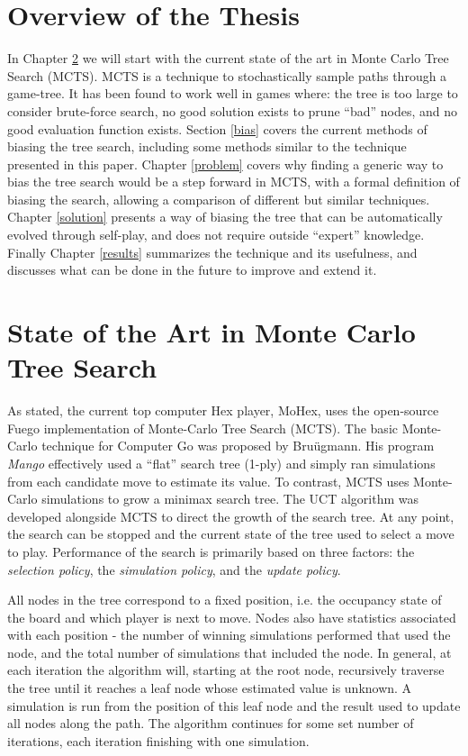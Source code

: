 \documentclass[11pt]{report}
\begin{document}
\section{Overview of the Thesis}\label{overview}
In Chapter \ref{mcts} we will start with the current state of the art in Monte Carlo Tree Search (MCTS). MCTS is a technique to stochastically sample paths through a game-tree. It has been found to work well in games where: the tree is too large to consider brute-force search, no good solution exists to prune ``bad'' nodes, and no good evaluation function exists. Section \ref{bias} covers the current methods of biasing the tree search, including some methods similar to the technique presented in this paper. Chapter \ref{problem} covers why finding a generic way to bias the tree search would be a step forward in MCTS, with a formal definition of biasing the search, allowing a comparison of different but similar techniques. Chapter \ref{solution} presents a way of biasing the tree that can be automatically evolved through self-play, and does not require outside ``expert'' knowledge. Finally Chapter \ref{results} summarizes the technique and its usefulness, and discusses what can be done in the future to improve and extend it.

\section{State of the Art in Monte Carlo Tree Search}\label{mcts}
As stated, the current top computer Hex player, MoHex, uses the open-source Fuego implementation of Monte-Carlo Tree Search (MCTS). The basic Monte-Carlo technique for Computer Go was proposed by Bru\"{u}gmann\cite{brugmann1993monte}. His program \emph{Mango} effectively used a ``flat'' search tree (1-ply) and simply ran simulations from each candidate move to estimate its value. To contrast, MCTS uses Monte-Carlo simulations to grow a minimax search tree. The UCT algorithm was developed alongside MCTS to direct the growth of the search tree\cite{gelly2006exploration}. At any point, the search can be stopped and the current state of the tree used to select a move to play. Performance of the search is primarily based on three factors: the \emph{selection policy}, the \emph{simulation policy}, and the \emph{update policy}.

All nodes in the tree correspond to a fixed position, i.e. the occupancy state of the board and which player is next to move. Nodes also have statistics associated with each position - the number of winning simulations performed that used the node, and the total number of simulations that included the node. In general, at each iteration the algorithm will, starting at the root node, recursively traverse the tree until it reaches a leaf node whose estimated value is unknown. A simulation is run from the position of this leaf node and the result used to update all nodes along the path. The algorithm continues for some set number of iterations, each iteration finishing with one simulation.
\end{document}
